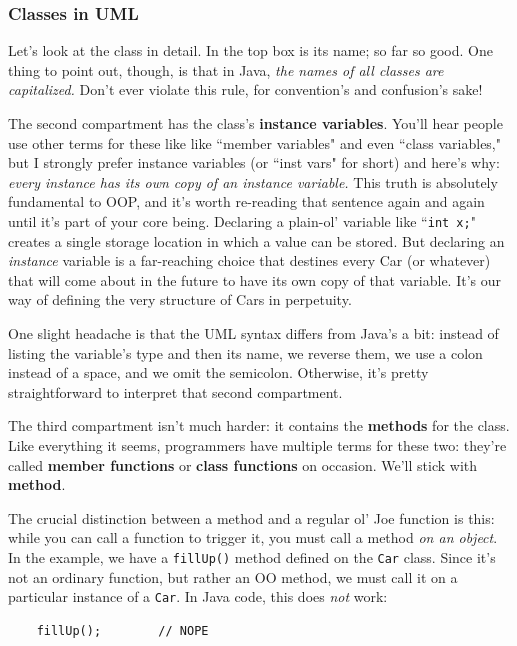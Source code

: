 \subsubsection{Classes in UML}

Let's look at the class in detail. In the top box is its name; so far so good.
One thing to point out, though, is that in Java, \textit{the names of all
classes are capitalized.} Don't ever violate this rule, for convention's and
confusion's sake!

The second compartment has the class's \textbf{instance variables}. You'll
hear people use other terms for these like like ``member variables" and even
``class variables," but I strongly prefer instance variables (or ``inst vars"
for short) and here's why: \textit{every instance has its own copy of an
instance variable.} This truth is absolutely fundamental to OOP, and it's
worth re-reading that sentence again and again until it's part of your core
being. Declaring a plain-ol' variable like ``\texttt{int x;}" creates a single
storage location in which a value can be stored. But declaring an
\textit{instance} variable is a far-reaching choice that destines every Car
(or whatever) that will come about in the future to have its own copy of that
variable. It's our way of defining the very structure of Cars in perpetuity.

One slight headache is that the UML syntax differs from Java's a bit: instead
of listing the variable's type and then its name, we reverse them, we use
a colon instead of a space, and we omit the semicolon. Otherwise, it's pretty
straightforward to interpret that second compartment.

The third compartment isn't much harder: it contains the \textbf{methods} for
the class. Like everything it seems, programmers have multiple terms for these
two: they're called \textbf{member functions} or \textbf{class functions} on
occasion. We'll stick with \textbf{method}.

The crucial distinction between a method and a regular ol' Joe function is
this: while you can call a function to trigger it, you must call a method
\textit{on an object}. In the example, we have a \texttt{fillUp()} method
defined on the \texttt{Car} class. Since it's not an ordinary function, but
rather an OO method, we must call it on a particular instance of a
\texttt{Car}. In Java code, this does \textit{not} work:

\begin{verbatim}
    fillUp();        // NOPE
\end{verbatim}


